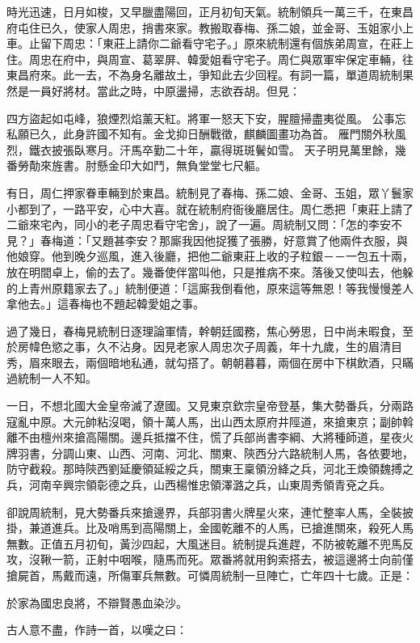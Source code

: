 時光迅速，日月如梭，又早臘盡陽回，正月初旬天氣。統制領兵一萬三千，在東昌府屯住已久，使家人周忠，捎書來家。教搬取春梅、孫二娘，並金哥、玉姐家小上車。止留下周忠：「東莊上請你二爺看守宅子。」原來統制還有個族弟周宣，在莊上住。周忠在府中，與周宣、葛翠屏、韓愛姐看守宅子。周仁與眾軍牢保定車輛，往東昌府來。此一去，不為身名離故土，爭知此去少回程。有詞一篇，單道周統制果然是一員好將材。當此之時，中原盪掃，志欲吞胡。但見：

四方盜起如屯峰，狼煙烈焰薰天紅。將軍一怒天下安，腥膻掃盡夷從風。
公事忘私願已久，此身許國不知有。金戈抑日酬戰徵，麒麟圖畫功為首。
雁門關外秋風烈，鐵衣披張臥寒月。汗馬卒勤二十年，贏得斑斑鬢如雪。
天子明見萬里餘，幾番勞勣來旌書。肘懸金印大如鬥，無負堂堂七尺軀。

有日，周仁押家眷車輛到於東昌。統制見了春梅、孫二娘、金哥、玉姐，眾丫鬟家小都到了，一路平安，心中大喜。就在統制府衙後廳居住。周仁悉把「東莊上請了二爺來宅內，同小的老子周忠看守宅舍」，說了一遍。周統制又問：「怎的李安不見？」春梅道：「又題甚李安？那廝我因他捉獲了張勝，好意賞了他兩件衣服，與他娘穿。他到晚夕巡風，進入後廳，把他二爺東莊上收的子粒銀－－一包五十兩，放在明間卓上，偷的去了。幾番使伴當叫他，只是推病不來。落後又使叫去，他躲的上青州原籍家去了。」統制便道：「這廝我倒看他，原來這等無恩！等我慢慢差人拿他去。」這春梅也不題起韓愛姐之事。

過了幾日，春梅見統制日逐理論軍情，幹朝廷國務，焦心勞思，日中尚未暇食，至於房幃色慾之事，久不沾身。因見老家人周忠次子周義，年十九歲，生的眉清目秀，眉來眼去，兩個暗地私通，就勾搭了。朝朝暮暮，兩個在房中下棋飲酒，只瞞過統制一人不知。

一日，不想北國大金皇帝滅了遼國。又見東京欽宗皇帝登基，集大勢番兵，分兩路寇亂中原。大元帥粘沒喝，領十萬人馬，出山西太原府井陘道，來搶東京；副帥斡離不由檀州來搶高陽關。邊兵抵擋不住，慌了兵部尚書李綱、大將種師道，星夜火牌羽書，分調山東、山西、河南、河北、關東、陝西分六路統制人馬，各依要地，防守截殺。那時陝西劉延慶領延綏之兵，關東王稟領汾絳之兵，河北王煥領魏搏之兵，河南辛興宗領彰德之兵，山西楊惟忠領澤潞之兵，山東周秀領青兗之兵。

卻說周統制，見大勢番兵來搶邊界，兵部羽書火牌星火來，連忙整率人馬，全裝披掛，兼道進兵。比及哨馬到高陽關上，金國乾離不的人馬，已搶進關來，殺死人馬無數。正值五月初旬，黃沙四起，大風迷目。統制提兵進趕，不防被乾離不兜馬反攻，沒鞦一箭，正射中咽喉，隨馬而死。眾番將就用鉤索搭去，被這邊將士向前僅搶屍首，馬戴而遠，所傷軍兵無數。可憐周統制一旦陣亡，亡年四十七歲。正是：

於家為國忠良將，不辯賢愚血染沙。

古人意不盡，作詩一首，以嘆之曰：

